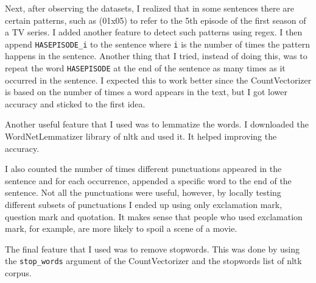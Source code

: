\documentclass[letterpaper,11pt]{article}
\begin{document}
Next, after observing the datasets, I realized that in some sentences there are certain patterns, such as (01x05) to refer to the 5th episode of the first season of a TV series. I added another feature to detect such patterns using regex. I then append \texttt{HASEPISODE\_i} to the sentence where \texttt{i} is the number of times the pattern happens in the sentence. Another thing that I tried, instead of doing this, was to repeat the word \texttt{HASEPISODE} at the end of the sentence as many times as it occurred in the sentence. I expected this to work better since the CountVectorizer is based on the number of times a word appears in the text, but I got lower accuracy and sticked to the first idea.

Another useful feature that I used was to lemmatize the words. I downloaded the WordNetLemmatizer library of nltk and used it. It helped improving the accuracy.

I also counted the number of times different punctuations appeared in the sentence and for each occurrence, appended a specific word to the end of the sentence. Not all the punctuations were useful, however, by locally testing different subsets of punctuations I ended up using only exclamation mark, question mark and quotation. It makes sense that people who used exclamation mark, for example, are more likely to spoil a scene of a movie.

The final feature that I used was to remove stopwords. This was done by using the \texttt{stop\_words} argument of the CountVectorizer and the stopwords list of nltk corpus.
\end{document}
